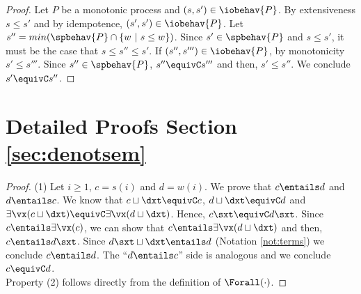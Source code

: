 \documentclass{tlp}
\begin{document}
\begin{proof}
Let $P$ be a monotonic process and 
$(s,s') \in \iobehav{P}$.
	By extensiveness $s\leq s'$ and by 
	idempotence,   $(s',s')\in \iobehav{P}$. 
	Let $s'' = min(\spbehav{P} \cap \{w \ | \ s \leq w \})$. Since $s' \in \spbehav{P}$ and $s\leq s'$, it must be the case that 
	$s\leq s'' \leq s'$. If $(s'',s''') \in \iobehav{P}$, by monotonicity $s'\leq s'''$. Since $s''\in \spbehav{P}$, $s''\equivC s'''$ and then, $s' \leq s''$. We conclude $s' \equivC s''$. 
\end{proof}

\section{Detailed Proofs Section \ref{sec:denotsem}} \label{app:proofs-den}
\begin{proof}
(1) Let $i\geq1$,  $c=s(i)$ and $d=w(i)$. We  prove that $c\entails d$ and $d\entails c$.  We know that  
$c\sqcup \dxt \equivC c$, $d\sqcup \dxt \equivC d$ and $\exists \vx (c\sqcup \dxt) \equivC \exists \vx (d\sqcup \dxt)$. Hence, $c\sxt \equivC d\sxt$. Since $c \entails \exists \vx( c)$, we can  show that 
$c \entails \exists \vx(d \sqcup \dxt)$ and then, $c\entails  d\sxt $.
Since $d\sxt \sqcup \dxt \entails d$ (Notation \ref{not:terms})  we conclude $c \entails d$. The  ``$d\entails c$'' side is analogous and we conclude $c \equivC d$. \\
Property (2) follows directly from the definition of $\Forall (\cdot)$. 
\end{proof}
\end{document}
